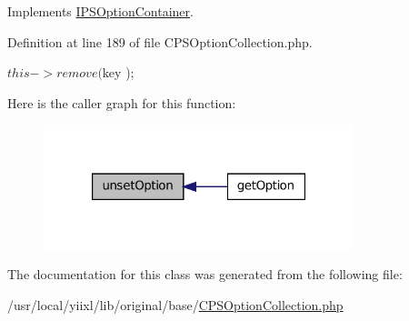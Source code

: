 Implements \hyperlink{interfaceIPSOptionContainer_a83519c09446eca599235b20a2cdcd094}{IPSOptionContainer}.



Definition at line 189 of file CPSOptionCollection.php.




\begin{DoxyCode}
{ $this->remove( $key ); }
\end{DoxyCode}




Here is the caller graph for this function:\nopagebreak
\begin{figure}[H]
\begin{center}
\leavevmode
\includegraphics[width=256pt]{classCPSOptionCollection_a83519c09446eca599235b20a2cdcd094_icgraph}
\end{center}
\end{figure}




The documentation for this class was generated from the following file:\begin{DoxyCompactItemize}
\item 
/usr/local/yiixl/lib/original/base/\hyperlink{CPSOptionCollection_8php}{CPSOptionCollection.php}\end{DoxyCompactItemize}
